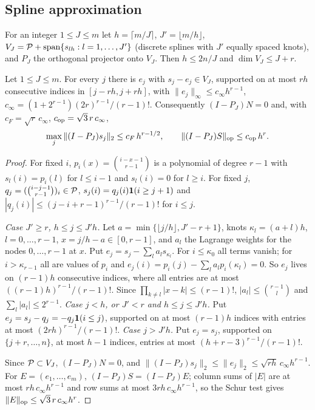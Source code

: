 \subsection{Spline approximation}

For an integer $1\le J\le m$ let $h=\lceil m/J\rceil$, $J'=\lfloor m/h\rfloor$, $V_J=\mathcal P+\mathrm{span}\{s_{lh}:l=1,\dots,J'\}$ (discrete splines with $J'$ equally spaced knots), and $P_J$ the orthogonal projector onto $V_J$. Then $h\le2n/J$ and $\dim V_J\le J+r$.

\begin{lemma}\label{pf:lem:F}
Let $1\le J\le m$. For every $j$ there is $e_j$ with $s_j-e_j\in V_J$, supported on at most $rh$ consecutive indices in $[j-rh,j+rh]$, with $\|e_j\|_\infty\le c_\infty h^{r-1}$, $c_\infty=(1+2^{r-1})(2r)^{r-1}/(r-1)!$. Consequently $(I-P_J)N=0$ and, with $c_F=\sqrt r\,c_\infty$, $c_{\mathrm{op}}=\sqrt3\,r\,c_\infty$,
\begin{equation}\label{pf:eq:F}
\max_{j}\|(I-P_J)s_j\|_2\le c_F\,h^{r-1/2},\qquad \|(I-P_J)S\|_{\mathrm{op}}\le c_{\mathrm{op}}\,h^{r}.
\end{equation}
\end{lemma}

\begin{proof}
For fixed $i$, $p_i(x)=\binom{i-x-1}{r-1}$ is a polynomial of degree $r-1$ with $s_l(i)=p_i(l)$ for $l\le i-1$ and $s_l(i)=0$ for $l\ge i$. For fixed $j$, $q_j=(\binom{i-j-1}{r-1})_i\in\mathcal P$, $s_j(i)=q_j(i)\mathbf 1(i\ge j+1)$ and $|q_j(i)|\le(j-i+r-1)^{r-1}/(r-1)!$ for $i\le j$.

\emph{Case $J'\ge r$, $h\le j\le J'h$.} Let $a=\min\{\lfloor j/h\rfloor,J'-r+1\}$, knots $\kappa_l=(a+l)h$, $l=0,\dots,r-1$, $x=j/h-a\in[0,r-1]$, and $a_l$ the Lagrange weights for the nodes $0,\dots,r-1$ at $x$. Put $e_j=s_j-\sum_la_ls_{\kappa_l}$. For $i\le\kappa_0$ all terms vanish; for $i>\kappa_{r-1}$ all are values of $p_i$ and $e_j(i)=p_i(j)-\sum_la_lp_i(\kappa_l)=0$. So $e_j$ lives on $(r-1)h$ consecutive indices, where all entries are at most $((r-1)h)^{r-1}/(r-1)!$. Since $\prod_{k\ne l}|x-k|\le(r-1)!$, $|a_l|\le\binom{r-1}{l}$ and $\sum_l|a_l|\le2^{r-1}$.
\emph{Case $j<h$, or $J'<r$ and $h\le j\le J'h$.} Put $e_j=s_j-q_j=-q_j\mathbf 1(i\le j)$, supported on at most $(r-1)h$ indices with entries at most $(2rh)^{r-1}/(r-1)!$.
\emph{Case $j>J'h$.} Put $e_j=s_j$, supported on $\{j+r,\dots,n\}$, at most $h-1$ indices, entries at most $(h+r-3)^{r-1}/(r-1)!$.

Since $\mathcal P\subset V_J$, $(I-P_J)N=0$, and $\|(I-P_J)s_j\|_2\le\|e_j\|_2\le\sqrt{rh}\,c_\infty h^{r-1}$. For $E=(e_1,\dots,e_m)$, $(I-P_J)S=(I-P_J)E$; column sums of $|E|$ are at most $rh\,c_\infty h^{r-1}$ and row sums at most $3rh\,c_\infty h^{r-1}$, so the Schur test gives $\|E\|_{\mathrm{op}}\le\sqrt3\,r\,c_\infty h^r$.
\end{proof}

